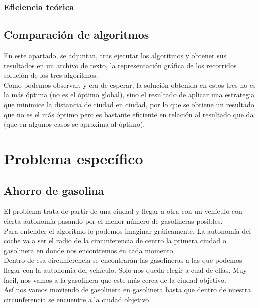\documentclass[11pt,a4paper]{article} %
\begin{document}
\subsubsection{Eficiencia teórica}


\newpage
\subsection{Comparación de algoritmos}
En este apartado, se adjuntan, tras ejecutar los algoritmos y obtener sus resultados en un archivo de texto, la representación gráfica de los recorridos solución de los tres algoritmos.\\

Como podemos observar, y era de esperar, la solución obtenida en estos tres no es la más óptima (no es el óptimo global), sino el resultado de aplicar una estrategia que minimice la distancia de ciudad en ciudad, por lo que se obtiene un resultado que no es el más óptimo pero es bastante eficiente en relación al resultado que da (que en algunos casos se aproxima al óptimo).



\newpage
\section{Problema específico}
\subsection{Ahorro de gasolina}
El problema trata de partir de una ciudad y llegar a otra con un vehículo con cierta autonomía pasando por el menor número de gasolineras posibles.\\

Para entender el algoritmo lo podemos imaginar gráficamente. La autonomía del coche va a ser el radio de la circunferencia de centro la primera ciudad o gasolinera en donde nos encontremos en cada momento.\\

Dentro de esa circunferencia se encontrarán las gasolineras a las que podemos llegar con la autonomía del vehículo. Solo nos queda elegir a cual de ellas. Muy facil, nos vamos a la gasolinera que este más cerca de la ciudad objetivo. \\

Así nos vamos moviendo de gasolinera en gasolinera hasta que dentro de nuestra circunferencia se encuentre a la ciudad objetivo.\\
\end{document}
